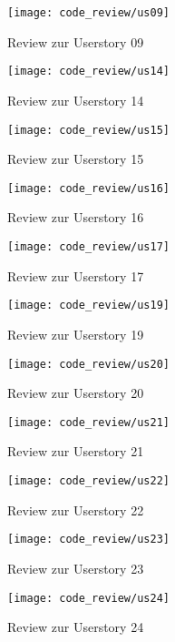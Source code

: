 \begin{figure}[H]
\centering
\texttt{[image: code\_review/us09]}
\caption{Review zur Userstory 09}
\end{figure}

\begin{figure}[H]
\centering
\texttt{[image: code\_review/us14]}
\caption{Review zur Userstory 14}
\end{figure}

\begin{figure}[H]
\centering
\texttt{[image: code\_review/us15]}
\caption{Review zur Userstory 15}
\end{figure}

\begin{figure}[H]
\centering
\texttt{[image: code\_review/us16]}
\caption{Review zur Userstory 16}
\end{figure}

\begin{figure}[H]
\centering
\texttt{[image: code\_review/us17]}
\caption{Review zur Userstory 17}
\end{figure}

\begin{figure}[H]
\centering
\texttt{[image: code\_review/us19]}
\caption{Review zur Userstory 19}
\end{figure}

\begin{figure}[H]
\centering
\texttt{[image: code\_review/us20]}
\caption{Review zur Userstory 20}
\end{figure}

\begin{figure}[H]
\centering
\texttt{[image: code\_review/us21]}
\caption{Review zur Userstory 21}
\end{figure}

\begin{figure}[H]
\centering
\texttt{[image: code\_review/us22]}
\caption{Review zur Userstory 22}
\end{figure}

\begin{figure}[H]
\centering
\texttt{[image: code\_review/us23]}
\caption{Review zur Userstory 23}
\end{figure}

\begin{figure}[H]
\centering
\texttt{[image: code\_review/us24]}
\caption{Review zur Userstory 24}
\end{figure}

